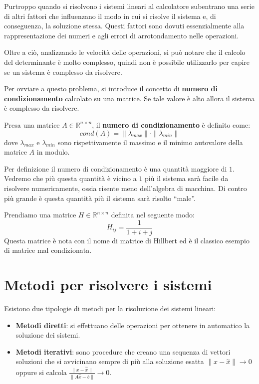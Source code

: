 Purtroppo quando si risolvono i sistemi lineari al calcolatore subentrano una
serie di altri fattori che influenzano il modo in cui si risolve il sistema e,
di conseguenza, la soluzione stessa. Questi fattori sono dovuti essenzialmente
alla rappresentazione dei numeri e agli errori di arrotondamento nelle operazioni.

Oltre a ciò, analizzando le velocità delle operazioni, si può notare che il
calcolo del determinante è molto complesso, quindi non è possibile utilizzarlo
per capire se un sistema è complesso da risolvere.

Per ovviare a questo problema, si introduce il concetto di \textbf{numero di
    condizionamento} calcolato su una matrice. Se tale valore è alto allora il
sistema è complesso da risolvere.
\begin{definizione}
    Presa una matrice $A \in \mathbb{R}^{n \times n}$, il \textbf{numero di
        condizionamento} è definito come:
    \begin{equation}
        cond(A) = \|\lambda_{max}\| \cdot \|\lambda_{min}\|
    \end{equation}
    dove $\lambda_{max}$ e $\lambda_{min}$ sono rispettivamente il massimo e il
    minimo autovalore della matrice $A$ in modulo.
\end{definizione}
Per definizione il numero di condizionamento è una quantità maggiore di $1$.
Vedremo che più questa quantità è vicino a $1$ più il sistema sarà facile da
risolvere numericamente, ossia risente meno dell'algebra di macchina. Di contro
più grande è questa quantità più il sistema sarà risolto “male”.
\begin{esempio}
    Prendiamo una matrice $H \in \mathbb{R}^{n \times n}$ definita nel seguente modo:
    \begin{equation*}
        H_{ij}=\frac{1}{1+i+j}
    \end{equation*}
    Questa matrice è nota con il nome di matrice di Hillbert ed è il classico
    esempio di matrice mal condizionata.
\end{esempio}
\section{Metodi per risolvere i sistemi}
Esistono due tipologie di metodi per la risoluzione dei sistemi lineari:
\begin{itemize}
    \item \textbf{Metodi diretti}: si effettuano delle operazioni per ottenere
          in automatico la soluzione dei sistemi.
    \item \textbf{Metodi iterativi}: sono procedure che creano una sequenza di
          vettori soluzioni che si avvicinano sempre di più alla soluzione esatta
          $\|x -\stackrel{\sim}{x}\|\rightarrow 0$ oppure si calcola $\frac{\|x
                  -\stackrel{\sim}{x}\|}{\|A\stackrel{\sim}{x} - b\|}\rightarrow 0$.
\end{itemize}

